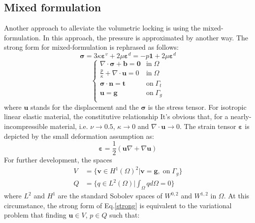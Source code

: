 \subsection{Mixed formulation}
Another approach to alleviate the volumetric locking is using the mixed-formulation. In this approach, the pressure is approximated by another way. The strong form for mixed-formulation is rephrased as follows:
\begin{equation}
\boldsymbol \sigma = 3\kappa \boldsymbol \varepsilon^v + 2\mu \boldsymbol \varepsilon^d 
= -p \boldsymbol 1 + 2\mu \boldsymbol \varepsilon^d
\end{equation}
\begin{equation}\label{strong_mix}
\begin{cases}
    \nabla \cdot \boldsymbol \sigma + \boldsymbol b = \boldsymbol 0 & \mathrm{in} \; \Omega \\
    \frac{p}{\kappa} + \nabla \cdot \boldsymbol u = 0 & \mathrm{in} \; \Omega \\
    \boldsymbol \sigma \cdot \boldsymbol n = \boldsymbol t & \mathrm{on} \; \Gamma_t \\
    \boldsymbol u = \boldsymbol g & \mathrm{on} \; \Gamma_g \\
\end{cases}
\end{equation}
where $\boldsymbol u$ stands for the displacement and the $\boldsymbol \sigma$ is the stress tensor. For isotropic linear elastic material, the constitutive relationship 
It's obvious that, for a nearly-incompressible material, i.e. $\nu \rightarrow 0.5$, $\kappa \rightarrow 0$ and $\nabla \cdot \boldsymbol u \rightarrow 0$.
The strain tensor $\boldsymbol \varepsilon$ is depicted by the small deformation assumption as:
\begin{equation}
\boldsymbol \varepsilon = \frac{1}{2}(\boldsymbol u \nabla + \nabla \boldsymbol u)
\end{equation}
For further development, the spaces 
\begin{align}
    V &= \{\boldsymbol v \in H^1(\Omega)^2 \vert \boldsymbol v = \boldsymbol g, \; \mathrm{on} \; \Gamma_g\} \\
    Q &= \{q \in L^2(\Omega) \vert \int_{\Omega} q d\Omega = 0\}
\end{align}
where $L^2$ and $H^1$ are the standard Sobolev spaces of $W^{0,2}$ and $W^{1,2}$ in $\Omega$. At this circumstance, the strong form of Eq.\eqref{strong} is equivalent to the variational problem that finding $\boldsymbol u \in V$, $p \in Q$ such that:
